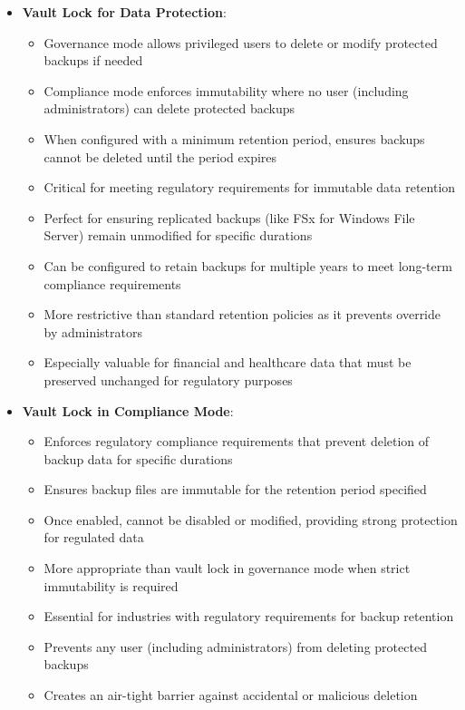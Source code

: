 \documentclass[11pt,a4paper]{report}
\begin{document}
\begin{itemize}
\begin{itemize}
\begin{itemize}
  \item Set up cross-region copy to a secondary region
\end{itemize}
  \item More operationally efficient than custom Lambda-based snapshot solutions
  \item Provides fully managed, centralized backup service across multiple AWS resources
  \item Ensures recoverability in different AWS regions for disaster recovery
  \item Offers simpler management than copying snapshots manually or with custom scripts
\end{itemize}
  \item \textbf{Vault Lock for Data Protection}:
\begin{itemize}
  \item Governance mode allows privileged users to delete or modify protected backups if needed
  \item Compliance mode enforces immutability where no user (including administrators) can delete protected backups
  \item When configured with a minimum retention period, ensures backups cannot be deleted until the period expires
  \item Critical for meeting regulatory requirements for immutable data retention
  \item Perfect for ensuring replicated backups (like FSx for Windows File Server) remain unmodified for specific durations
  \item Can be configured to retain backups for multiple years to meet long-term compliance requirements
  \item More restrictive than standard retention policies as it prevents override by administrators
  \item Especially valuable for financial and healthcare data that must be preserved unchanged for regulatory purposes
\end{itemize}
  \item \textbf{Vault Lock in Compliance Mode}:
\begin{itemize}
  \item Enforces regulatory compliance requirements that prevent deletion of backup data for specific durations
  \item Ensures backup files are immutable for the retention period specified
  \item Once enabled, cannot be disabled or modified, providing strong protection for regulated data
  \item More appropriate than vault lock in governance mode when strict immutability is required
  \item Essential for industries with regulatory requirements for backup retention
  \item Prevents any user (including administrators) from deleting protected backups
  \item Creates an air-tight barrier against accidental or malicious deletion
\end{itemize}
\end{itemize}
\end{document}
